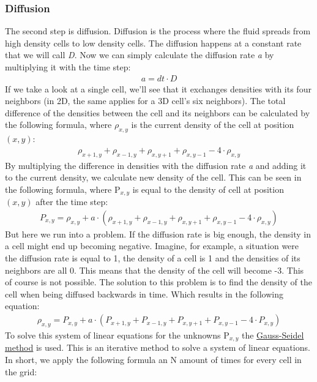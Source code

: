 \documentclass[a4paper,12pt,titlepage]{article}
\begin{document}
\subsubsection{Diffusion} \label{diffusion}
The second step is diffusion.
Diffusion is the process where the fluid spreads from high density cells to low density cells.
The diffusion happens at a constant rate that we will call \textit{D}. 
Now we can simply calculate the diffusion rate \textit{a} by multiplying it with the time step:
\[
\begin{array}{ll}
  a = dt \cdot D
\end{array}
\]
If we take a look at a single cell, we'll see that it exchanges densities with its four neighbors (in 2D, the same applies for a 3D cell's six neighbors).
The total difference of the densities between the cell and its neighbors can be calculated by the following formula,
where $\rho_{x, y}$ is the current density of the cell at position $(x, y)$:
\[
\begin{array}{ll}
	\rho_{x+1, y} + \rho_{x-1, y} + \rho_{x, y+1} + \rho_{x, y-1} - 4 \cdot \rho_{x, y}
\end{array}
\]
By multiplying the difference in densities with the diffusion rate \textit{a} and adding it to the current density, we calculate new density of the cell. 
This can be seen in the following formula, where P$_{x, y}$ is equal to the density of cell at position $(x, y)$ after the time step:
\[
\begin{array}{ll}
	P_{x, y} = \rho_{x, y} + a \cdot (\rho_{x+1, y} + \rho_{x-1, y} + \rho_{x, y+1} + \rho_{x, y-1} - 4 \cdot \rho_{x, y})
\end{array}
\]
But here we run into a problem. If the diffusion rate is big enough, the density in a cell might end up becoming negative.
Imagine, for example, a situation were the diffusion rate is equal to 1,  the density of a cell is 1 and the densities of its neighbors are all 0. This means that the density of the cell will become -3.
This of course is not possible.
The solution to this problem is to find the density of the cell when being diffused backwards in time. Which results in the following equation:
\[
\begin{array}{ll}
	\rho_{x, y} = P_{x, y} + a \cdot (P_{x+1, y} + P_{x-1, y} + P_{x, y+1} + P_{x, y-1} - 4 \cdot P_{x, y})
\end{array}	
\]
To solve this system of linear equations for the unknowns P$_{x, y}$ the \href{https://en.wikipedia.org/wiki/Gauss–Seidel_method}{Gauss-Seidel method} is used.
This is an iterative method to solve a system of linear equations. In short, we apply the following formula an N amount of times for every cell in the grid:
\end{document}
